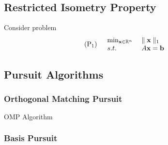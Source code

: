 \subsection{Restricted Isometry Property}
Consider problem
\begin{align}
    (\textnormal{P}_1) \quad
    \begin{array}{ll}
        \min_{\mathbf{x} \in \mathbb{R}^n}
        \ &\parallel \mathbf{x} \parallel_1 \\
        s.t. \ &A\mathbf{x} = \mathbf{b}
    \end{array}
\end{align}

\subsection{Pursuit Algorithms}
\subsubsection{Orthogonal Matching Pursuit}

\begin{algorithm}[H]
    \SetAlgoLined
    \KwData{}
     \;
     \While{}{
     }
     \Return{}
     \caption{OMP Algorithm}
\end{algorithm}

\subsubsection{Basis Pursuit}